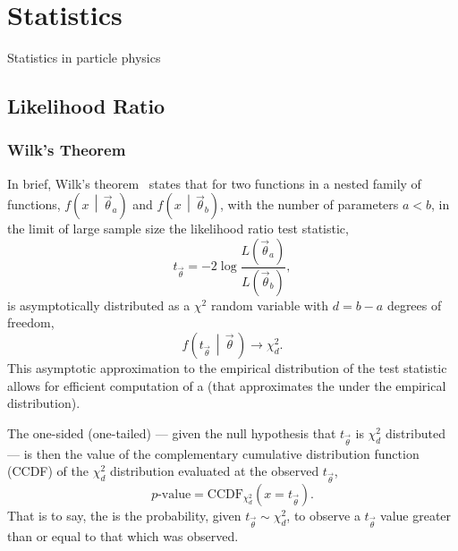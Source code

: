 \section{Statistics}\label{section:statistics}

Statistics in particle physics

\subsection{Likelihood Ratio}\label{section:likelihood_ratio}

\subsubsection{Wilk's Theorem}\label{subsection:wilks_theorem}

In brief, Wilk's theorem~\cite{Wilks:1938dza} states that for two functions in a nested family of functions, $f\left(x\,\middle|\,\vec{\theta}_{a}\right)$ and $f\left(x\,\middle|\,\vec{\theta}_{b}\right)$, with the number of parameters $a < b$, in the limit of large sample size the likelihood ratio test statistic,
\begin{equation}
 t_{\vec{\theta}} = -2 \log \frac{\displaystyle L\left(\vec{\theta}_{a}\right)}{\displaystyle L\left(\vec{\theta}_{b}\right)},
\end{equation}
is asymptotically distributed as a $\chi^2$ random variable with $d=b-a$ degrees of freedom,
\begin{equation}
 f\left(t_{\vec{\theta}} \,\middle|\,\vec{\theta}\, \right) \to \chi^2_{d}.\label{eq:wilks_theorem}
\end{equation}
This asymptotic approximation to the empirical distribution of the test statistic allows for efficient computation of a \pvalue{} (that approximates the \pvalue{} under the empirical distribution).

The one-sided (one-tailed) \pvalue{} --- given the null hypothesis that $t_{\vec{\theta}}$ is $\chi_{d}^{2}$ distributed --- is then the value of the complementary cumulative distribution function (CCDF) of the $\chi^2_{d}$ distribution evaluated at the observed $t_{\vec{\theta}}$,
\begin{equation}
 p\textrm{-value} = \textrm{CCDF}_{\chi^2_{d}}\left(x=t_{\vec{\theta}}\right).
\end{equation}
That is to say, the \pvalue{} is the probability, given $t_{\vec{\theta}} \sim \chi^2_{d}$, to observe a $t_{\vec{\theta}}$ value greater than or equal to that which was observed.

